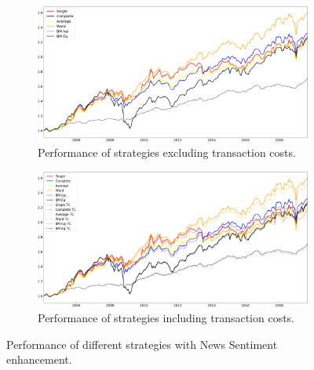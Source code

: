\newpage
\begin{figure}[H] %
\centering

\begin{subfigure}{0.8\textwidth}%
\centering
\includegraphics[width=\linewidth]{Plots_and_Tables/perf_noTC_with_NS_F_2_B_0_LB_12_0.png}
\caption{Performance of strategies excluding transaction costs.} \label{fig:notc_NS_perf}
\end{subfigure}%

\medskip
\begin{subfigure}{0.8\textwidth}%
\centering
\includegraphics[width=\linewidth]{Plots_and_Tables/perf_noTC_andTC_with_NS_F_2_B_0_LB_12_0.png}
\caption{Performance of strategies including transaction costs.} \label{fig:tc_NS_perf}
\end{subfigure}%




\caption{Performance of different strategies with News Sentiment enhancement.} \label{fig:noNS_perf}
\end{figure}
\newpage